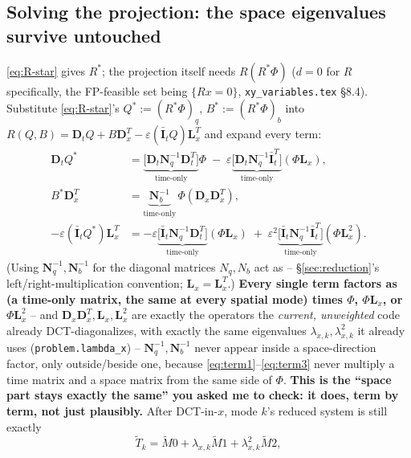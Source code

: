 \documentclass[11pt]{article}
\newcommand{\code}[1]{\texttt{#1}}
\begin{document}
\subsection{Solving the projection: the space eigenvalues survive untouched}
\label{sec:space-survives}

\eqref{eq:R-star} gives $R^*$; the projection itself needs $R(R^*\Phi)$ ($d=0$ for $R$
specifically, the FP-feasible set being $\{Rx=0\}$, \code{xy\_variables.tex} \S8.4).
Substitute \eqref{eq:R-star}'s
$Q^*:=(R^*\Phi)_q,\,B^*:=(R^*\Phi)_b$ into $R(Q,B)=\mathbf D_tQ+B\mathbf D_x^T-
\varepsilon(\bar{\mathbf I}_tQ)\mathbf L_x^T$ and expand every term:
\begin{align}
  \mathbf D_tQ^* &= \underbrace{\bigl[\mathbf D_t\mathbf N_q^{-1}\mathbf D_t^T\bigr]}_{\text{time-only}}\Phi
    \;-\;\varepsilon\underbrace{\bigl[\mathbf D_t\mathbf N_q^{-1}\bar{\mathbf I}_t^T\bigr]}_{\text{time-only}}(\Phi\mathbf L_x), \label{eq:term1}\\
  B^*\mathbf D_x^T &= \underbrace{\mathbf N_b^{-1}}_{\text{time-only}}\,\Phi(\mathbf D_x\mathbf D_x^T), \label{eq:term2}\\
  -\varepsilon(\bar{\mathbf I}_tQ^*)\mathbf L_x^T &=
    -\varepsilon\underbrace{\bigl[\bar{\mathbf I}_t\mathbf N_q^{-1}\mathbf D_t^T\bigr]}_{\text{time-only}}(\Phi\mathbf L_x)
    \;+\;\varepsilon^2\underbrace{\bigl[\bar{\mathbf I}_t\mathbf N_q^{-1}\bar{\mathbf I}_t^T\bigr]}_{\text{time-only}}(\Phi\mathbf L_x^2). \label{eq:term3}
\end{align}
(Using $\mathbf N_q^{-1},\mathbf N_b^{-1}$ for the diagonal matrices $N_q,N_b$ act as --
\S\ref{sec:reduction}'s left/right-multiplication convention; $\mathbf L_x=\mathbf L_x^T$.)
\textbf{Every single term factors as (a time-only matrix, the same at every spatial
mode) times $\Phi$, $\Phi\mathbf L_x$, or $\Phi\mathbf L_x^2$} -- and
$\mathbf D_x\mathbf D_x^T,\mathbf L_x,\mathbf L_x^2$ are exactly the operators the
\emph{current, unweighted} code already DCT-diagonalizes, with exactly the same
eigenvalues $\lambda_{x,k},\lambda_{x,k}^2$ it already uses
(\code{problem.lambda\_x}) -- $\mathbf N_q^{-1},\mathbf N_b^{-1}$ never appear inside a
space-direction factor, only outside/beside one, because \eqref{eq:term1}--\eqref{eq:term3}
never multiply a time matrix and a space matrix from the same side of $\Phi$. \textbf{This
is the ``space part stays exactly the same'' you asked me to check: it does, term by
term, not just plausibly.} After DCT-in-$x$, mode $k$'s reduced system is still exactly
\begin{equation}
  \label{eq:Tk-weighted}
  \widetilde T_k = \widetilde M0 + \lambda_{x,k}\widetilde M1 + \lambda_{x,k}^2\widetilde M2,
\end{equation}
\end{document}
